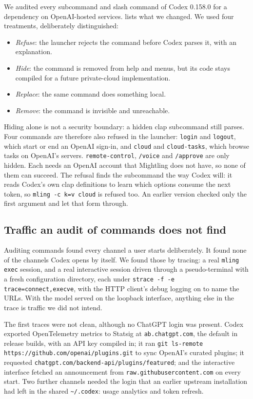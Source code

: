 \documentclass[11pt]{article}
\newcommand{\code}[1]{\texttt{#1}}
\begin{document}
We audited every subcommand and slash command of Codex 0.158.0 for a dependency on OpenAI-hosted
services.  lists what we changed. We used four treatments, deliberately
distinguished:
\begin{itemize}
  \item \emph{Refuse}: the launcher rejects the command before Codex parses it, with an explanation.
  \item \emph{Hide}: the command is removed from help and menus, but its code stays compiled for a
    future private-cloud implementation.
  \item \emph{Replace}: the same command does something local.
  \item \emph{Remove}: the command is invisible and unreachable.
\end{itemize}
Hiding alone is not a security boundary: a hidden clap subcommand still parses. Four commands are
therefore also refused in the launcher: \code{login} and \code{logout}, which start or end an
OpenAI sign-in, and \code{cloud} and \code{cloud-tasks}, which browse tasks on OpenAI's servers.
\code{remote-control}, \code{/voice} and \code{/approve} are only hidden. Each needs an OpenAI
account that Mightling does not have, so none of them can succeed.
The refusal finds the subcommand the way Codex will: it reads Codex's own clap definitions to learn
which options consume the next token, so \code{mling -c k=v cloud} is refused too. An earlier
version checked only the first argument and let that form through.

\subsection{Traffic an audit of commands does not find}
\label{sec:egress}

Auditing commands found every channel a user starts deliberately. It found none of the channels
Codex opens by itself. We found those by tracing: a real \code{mling exec} session, and a real
interactive session driven through a pseudo-terminal with a fresh configuration directory, each
under \code{strace -f -e trace=connect,execve}, with the HTTP client's debug logging on to name the
URLs. With the model served on the loopback interface, anything else in the trace is traffic we
did not intend.

The first traces were not clean, although no ChatGPT login was present. Codex exported OpenTelemetry
metrics to Statsig at \code{ab.chatgpt.com}, the default in release builds, with an API key compiled
in; it ran \code{git ls-remote https://github.com/openai/plugins.git} to sync OpenAI's curated
plugins; it requested \code{chatgpt.com/backend-api/plugins/featured}; and the interactive
interface fetched an announcement from \code{raw.githubusercontent.com} on every start. Two further
channels needed the login that an earlier upstream installation had left in the shared
\code{\textasciitilde/.codex}: usage analytics and token refresh.
\end{document}

